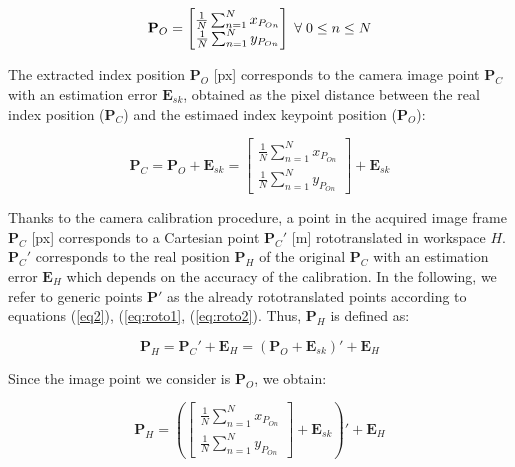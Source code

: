 \documentclass[a4paper, 10 pt, conference]{ieeeconf}      %
\begin{document}
\begin{equation}
\mathbf{P}_O = \begin{bmatrix}
\frac{1}{N}\sum_{n=1}^{N}x_{P_{On}} \\
\frac{1}{N}\sum_{n=1}^{N}y_{P_{On}}
\end{bmatrix}
\thickspace \forall\thickspace 0 \leq n \leq N
\end{equation}

The extracted index position $\mathbf{P}_O$ [px] corresponds to the camera image point $\mathbf{P}_C$ with an estimation error $\mathbf{E}_{sk}$, obtained as the pixel distance between the real index position ($\mathbf{P}_C$) and the estimaed index keypoint position ($\mathbf{P}_O$):

\begin{equation}
\mathbf{P}_C = \mathbf{P}_O + \mathbf{E}_{sk} = \begin{bmatrix}
\frac{1}{N}\sum_{n=1}^{N}x_{P_{On}} \\
\frac{1}{N}\sum_{n=1}^{N}y_{P_{On}}
\end{bmatrix} + \mathbf{E}_{sk}
\end{equation}

Thanks to the camera calibration procedure, a point in the acquired image frame $\mathbf{P}_C$ [px] corresponds to a Cartesian point $\mathbf{P}_C'$ [m] rototranslated in workspace $H$. $\mathbf{P}_C'$ corresponds to the real position $\mathbf{P}_H$ of the original $\mathbf{P}_C$ with an estimation error $\mathbf{E}_H$ which depends on the accuracy of the calibration. In the following, we refer to generic points $\mathbf{P}'$ as the already rototranslated points according to equations (\ref{eq2}), (\ref{eq:roto1}, (\ref{eq:roto2}). Thus, $\mathbf{P}_H$ is defined as:

\begin{equation}
\mathbf{P}_H = \mathbf{P}_C' + \mathbf{E}_H = (\mathbf{P}_O + \mathbf{E}_{sk})' + \mathbf{E}_H
\end{equation}

Since the image point we consider is $\mathbf{P}_O$, we obtain: 

\begin{equation}
\mathbf{P}_H = \left(\begin{bmatrix}
\frac{1}{N}\sum_{n=1}^{N}x_{P_{On}} \\
\frac{1}{N}\sum_{n=1}^{N}y_{P_{On}}
\end{bmatrix} + \mathbf{E}_{sk} \right)' + \mathbf{E}_H
\end{equation}
\end{document}
